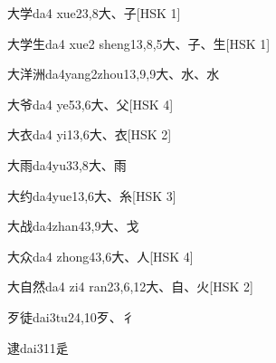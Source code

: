 \begin{entry}{大学}{da4 xue2}{3,8}{⼤、⼦}[HSK 1]
\end{entry}

\begin{entry}{大学生}{da4 xue2 sheng1}{3,8,5}{⼤、⼦、⽣}[HSK 1]
\end{entry}

\begin{entry}{大洋洲}{da4yang2zhou1}{3,9,9}{⼤、⽔、⽔}
\end{entry}

\begin{entry}{大爷}{da4 ye5}{3,6}{⼤、⽗}[HSK 4]
\end{entry}

\begin{entry}{大衣}{da4 yi1}{3,6}{⼤、⾐}[HSK 2]
\end{entry}

\begin{entry}{大雨}{da4yu3}{3,8}{⼤、⾬}
\end{entry}

\begin{entry}{大约}{da4yue1}{3,6}{⼤、⽷}[HSK 3]
\end{entry}

\begin{entry}{大战}{da4zhan4}{3,9}{⼤、⼽}
\end{entry}

\begin{entry}{大众}{da4 zhong4}{3,6}{⼤、⼈}[HSK 4]
\end{entry}

\begin{entry}{大自然}{da4 zi4 ran2}{3,6,12}{⼤、⾃、⽕}[HSK 2]
\end{entry}

\begin{entry}{歹徒}{dai3tu2}{4,10}{⽍、⼻}
\end{entry}

\begin{entry}{逮}{dai3}{11}{⾡}
\end{entry}

